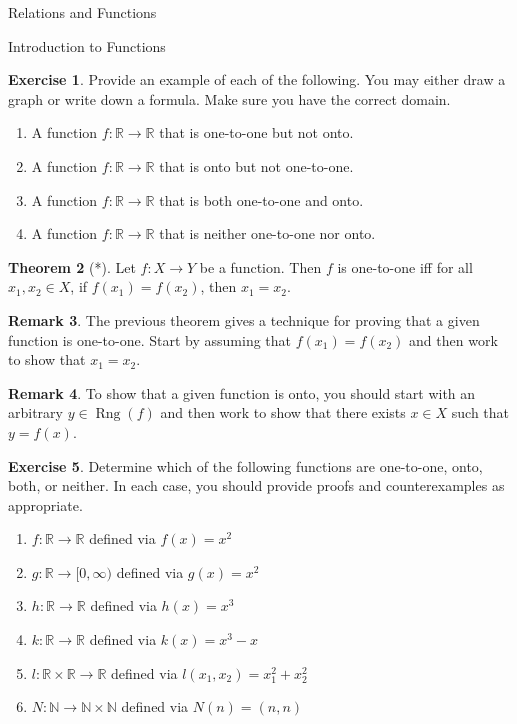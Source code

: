 \documentclass[11pt]{article}
\newcommand{\range}{\operatorname{Rng}}
\theoremstyle{definition}
\newtheorem{theorem}{Theorem}[section]
\newtheorem{exercise}[theorem]{Exercise}
\newtheorem{remark}[theorem]{Remark}
\begin{document}
\begin{section}{Relations and Functions}
\begin{subsection}{Introduction to Functions}
\begin{exercise}
Provide an example of each of the following.  You may either draw a graph or write down a formula.  Make sure you have the correct domain.
\begin{enumerate}
\item A function $f:\mathbb{R}\to \mathbb{R}$ that is one-to-one but not onto.
\item A function $f:\mathbb{R}\to \mathbb{R}$ that is onto but not one-to-one.
\item A function $f:\mathbb{R}\to \mathbb{R}$ that is both one-to-one and onto.
\item A function $f:\mathbb{R}\to \mathbb{R}$ that is neither one-to-one nor onto.
\end{enumerate}

\end{exercise}

\begin{theorem}[*]
Let $f:X\to Y$ be a function.  Then $f$ is one-to-one iff for all $x_{1}, x_{2}\in X$, if $f(x_{1})=f(x_{2})$, then $x_{1}=x_{2}$.
\end{theorem}

\begin{remark}
The previous theorem gives a technique for proving that a given function is one-to-one.  Start by assuming that $f(x_{1})=f(x_{2})$ and then work to show that $x_{1}=x_{2}$.
\end{remark}

\begin{remark}
To show that a given function is onto, you should start with an arbitrary $y\in \range(f)$ and then work to show that there exists $x\in X$ such that $y=f(x)$.
\end{remark}

\begin{exercise}
Determine which of the following functions are one-to-one, onto, both, or neither.  In each case, you should provide proofs and counterexamples as appropriate.

\begin{enumerate}
\item $f:\mathbb{R}\to \mathbb{R}$ defined via $f(x)=x^{2}$
\item $g:\mathbb{R}\to [0,\infty)$ defined via $g(x)=x^{2}$
\item $h:\mathbb{R}\to \mathbb{R}$ defined via $h(x)=x^{3}$
\item $k:\mathbb{R}\to \mathbb{R}$ defined via $k(x)=x^{3}-x$
\item $l: \mathbb{R}\times \mathbb{R}\to \mathbb{R}$ defined via $l(x_{1},x_{2})=x_{1}^{2}+x_{2}^{2}$
\item $N:\mathbb{N}\to \mathbb{N}\times \mathbb{N}$ defined via $N(n)=(n,n)$
\end{enumerate}
\end{exercise}


\end{subsection}
\end{section}
\end{document}

